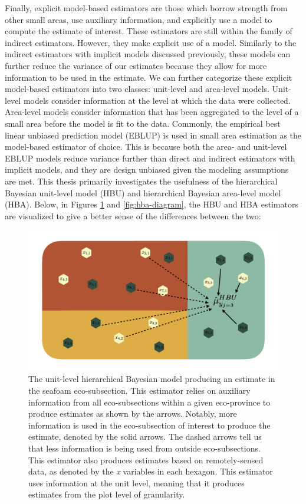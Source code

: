\documentclass[12pt,twoside]{reedthesis}
\begin{document}
Finally, explicit model-based estimators are those which borrow strength from other small areas, use auxiliary information, and explicitly use a model to compute the estimate of interest. These estimators are still within the family of indirect estimators. However, they make explicit use of a model. Similarly to the indirect estimators with implicit models discussed previously, these models can further reduce the variance of our estimates because they allow for more information to be used in the estimate. We can further categorize these explicit model-based estimators into two classes: unit-level and area-level models. Unit-level models consider information at the level at which the data were collected. Area-level models consider information that has been aggregated to the level of a small area before the model is fit to the data. Commonly, the empirical best linear unbiased prediction model (EBLUP) is used in small area estimation as the model-based estimator of choice. This is because both the area- and unit-level EBLUP models reduce variance further than direct and indirect estimators with implicit models, and they are design unbiased given the modeling assumptions are met. This thesis primarily investigates the usefulness of the hierarchical Bayesian unit-level model (HBU) and hierarchical Bayesian area-level model (HBA). Below, in Figures \ref{fig:hbu-diagram} and \ref{fig:hba-diagram}, the HBU and HBA estimators are visualized to give a better sense of the differences between the two:
\begin{figure}

{\centering \includegraphics[width=1\linewidth]{figure/hbu-diagram} 

}

\caption[The unit-level hierarchical Bayesian model]{The unit-level hierarchical Bayesian model producing an estimate in the seafoam eco-subsection. This estimator relies on auxiliary information from all eco-subsections within a given eco-province to produce estimates as shown by the arrows. Notably, more information is used in the eco-subsection of interest to produce the estimate, denoted by the solid arrows. The dashed arrows tell us that less information is being used from outside eco-subsections. This estimator also produces estimates based on remotely-sensed data, as denoted by the \textit{x} variables in each hexagon. This estimator uses information at the unit level, meaning that it produces estimates from the plot level of granularity.}\label{fig:hbu-diagram}
\end{figure}
\end{document}
